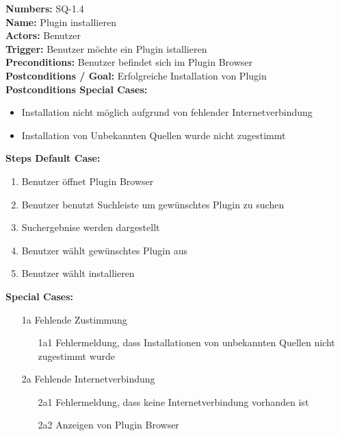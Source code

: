 \documentclass{article}
\begin{document}
\newpage
\begin{samepage}
    \textbf{Numbers:} SQ-1.4\\
    \textbf{Name:} Plugin installieren\\
    \textbf{Actors:} Benutzer\\
    \textbf{Trigger:} Benutzer möchte ein Plugin istallieren\\
    \textbf{Preconditions:}  Benutzer befindet sich im Plugin Browser\\
    \textbf{Postconditions / Goal:} Erfolgreiche Installation von Plugin\\
    \textbf{Postconditions Special Cases:}
    \begin{itemize}
        \item Installation nicht möglich aufgrund von fehlender Internetverbindung
        \item Installation von Unbekannten Quellen wurde nicht zugestimmt
    \end{itemize}
    \textbf{Steps Default Case:} 
    \begin{enumerate}
        \item Benutzer öffnet Plugin Browser
        \item Benutzer benutzt Suchleiste um gewünschtes Plugin zu suchen
        \item Suchergebnise werden dargestellt 
        \item Benutzer wählt gewünschtes Plugin aus
        \item Benutzer wählt installieren
    \end{enumerate}
\textbf{Special Cases:}
\begin{itemize}
    \item [1a] Fehlende Zustimmung
    \begin{itemize}
        \item [1a1] Fehlermeldung, dass Installationen von unbekannten Quellen nicht zugestimmt wurde
    \end{itemize}
    \end{itemize}
        
\begin{itemize}
    \item [2a] Fehlende Internetverbindung  
    \begin{itemize}
        \item [2a1] Fehlermeldung, dass keine Internetverbindung vorhanden ist 
        \item [2a2] Anzeigen von Plugin Browser
    \end{itemize}
\end{itemize}
\end{samepage}
\end{document}

